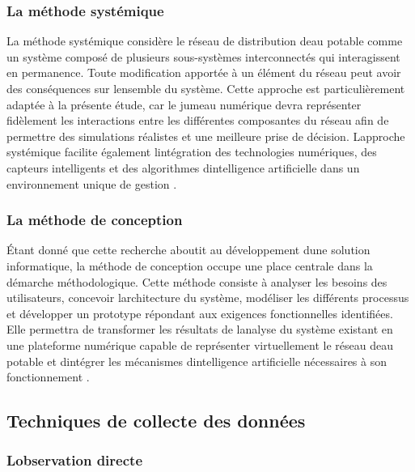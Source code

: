\subsubsection{La méthode
	systémique}\label{b-la-muxe9thode-systuxe9mique}

La méthode systémique considère le réseau de distribution
d\textquotesingle eau potable comme un système composé de plusieurs
sous-systèmes interconnectés qui interagissent en permanence. Toute
modification apportée à un élément du réseau peut avoir des conséquences
sur l\textquotesingle ensemble du système. Cette approche est
particulièrement adaptée à la présente étude, car le jumeau numérique
devra représenter fidèlement les interactions entre les différentes
composantes du réseau afin de permettre des simulations réalistes et une
meilleure prise de décision. L\textquotesingle approche systémique
facilite également l\textquotesingle intégration des technologies
numériques, des capteurs intelligents et des algorithmes
d\textquotesingle intelligence artificielle dans un environnement unique
de gestion \cite{ref109}.

\subsubsection{La méthode de
	conception}\label{c-la-muxe9thode-de-conception}

Étant donné que cette recherche aboutit au développement
d\textquotesingle une solution informatique, la méthode de conception
occupe une place centrale dans la démarche méthodologique. Cette méthode
consiste à analyser les besoins des utilisateurs, concevoir
l\textquotesingle architecture du système, modéliser les différents
processus et développer un prototype répondant aux exigences
fonctionnelles identifiées. Elle permettra de transformer les résultats
de l\textquotesingle analyse du système existant en une plateforme
numérique capable de représenter virtuellement le réseau
d\textquotesingle eau potable et d\textquotesingle intégrer les
mécanismes d\textquotesingle intelligence artificielle nécessaires à son
fonctionnement \cite{ref106}.

\subsection{Techniques de collecte des données}\label{techniques-de-collecte-des-donnuxe9es}

\subsubsection{L\textquotesingle observation
	directe}\label{a-lobservation-directe}


